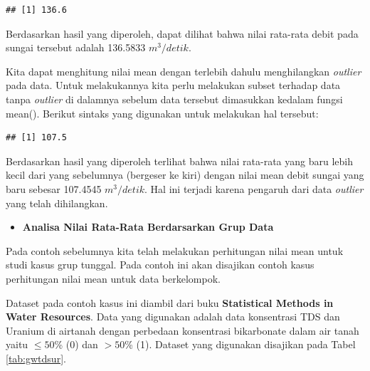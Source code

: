 \documentclass[]{book}
\newenvironment{Shaded}{\begin{snugshade}}{\end{snugshade}}
\newcommand{\KeywordTok}[1]{\textcolor[rgb]{0.13,0.29,0.53}{\textbf{#1}}}
\newcommand{\DecValTok}[1]{\textcolor[rgb]{0.00,0.00,0.81}{#1}}
\newcommand{\StringTok}[1]{\textcolor[rgb]{0.31,0.60,0.02}{#1}}
\newcommand{\CommentTok}[1]{\textcolor[rgb]{0.56,0.35,0.01}{\textit{#1}}}
\newcommand{\OperatorTok}[1]{\textcolor[rgb]{0.81,0.36,0.00}{\textbf{#1}}}
\newcommand{\NormalTok}[1]{#1}
\providecommand{\tightlist}{%
  \setlength{\itemsep}{0pt}\setlength{\parskip}{0pt}}
\begin{document}
\begin{verbatim}
## [1] 136.6
\end{verbatim}

Berdasarkan hasil yang diperoleh, dapat dilihat bahwa nilai rata-rata
debit pada sungai tersebut adalah 136.5833 \(m^3/detik\).

Kita dapat menghitung nilai mean dengan terlebih dahulu menghilangkan
\emph{outlier} pada data. Untuk melakukannya kita perlu melakukan subset
terhadap data tanpa \emph{outlier} di dalamnya sebelum data tersebut
dimasukkan kedalam fungsi mean(). Berikut sintaks yang digunakan untuk
melakukan hal tersebut:

\begin{Shaded}
\end{Shaded}

\begin{verbatim}
## [1] 107.5
\end{verbatim}

Berdasarkan hasil yang diperoleh terlihat bahwa nilai rata-rata yang
baru lebih kecil dari yang sebelumnya (bergeser ke kiri) dengan nilai
mean debit sungai yang baru sebesar 107.4545 \(m^3/detik\). Hal ini
terjadi karena pengaruh dari data \emph{outlier} yang telah dihilangkan.

\begin{itemize}
\tightlist
\item
  \textbf{Analisa Nilai Rata-Rata Berdarsarkan Grup Data}
\end{itemize}

Pada contoh sebelumnya kita telah melakukan perhitungan nilai mean untuk
studi kasus grup tunggal. Pada contoh ini akan disajikan contoh kasus
perhitungan nilai mean untuk data berkelompok.

Dataset pada contoh kasus ini diambil dari buku \textbf{Statistical
Methods in Water Resources}. Data yang digunakan adalah data konsentrasi
TDS dan Uranium di airtanah dengan perbedaan konsentrasi bikarbonate
dalam air tanah yaitu \(\leq 50\)\% (0) dan \(>50\)\% (1). Dataset yang
digunakan disajikan pada Tabel \ref{tab:gwtdsur}.
\end{document}
